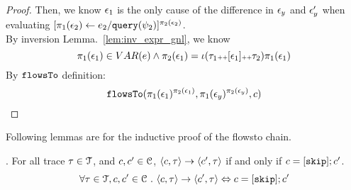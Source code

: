 \begin{proof}
Then, we know $\mathtt{\epsilon}_1$ is the only cause of the difference in $\mathtt{\epsilon}_y$ and $\mathtt{\epsilon}_y'$ when evaluating 
$[\mathrel{ \pi_1(\mathtt{\epsilon}_2) \leftarrow e_2 / {\tt query}(\psi_2) }]{}^{\pi_2(\mathtt{\epsilon}_2)}$.
%
\\
By inversion Lemma.~\ref{lem:inv_expr_gnl}, we know
\[
  \pi_1(\mathtt{\epsilon}_1) \in VAR(e) \land {\pi_2(\ensuremath{\mathtt{\epsilon}}_1)} = \iota(\mathtt{\tau}_1 {\scriptscriptstyle ++} [\mathtt{\epsilon}_1] {\scriptscriptstyle ++} \mathtt{\tau}_2) \pi_1(\mathtt{\epsilon}_1) 
\]
%
By $\mathtt{flowsTo}$ definition:
\[
  \mathtt{flowsTo}(\pi_1(\mathtt{\epsilon}_1)^{\pi_2(\mathtt{\epsilon}_1)}, \pi_1(\mathtt{\epsilon}_y)^{\pi_2(\mathtt{\epsilon}_y)}, c)
\]
\end{proof}
%
Following lemmas are for the inductive proof of the flowsto chain.
\begin{lem}.
	\label{lem:inv_skip}
	For all trace $\mathtt{\tau}\in \mathcal{T}$, and $c, c' \in \mathcal{C}$,  
	$\langle c, \mathtt{\tau} \rangle \rightarrow \langle c', \mathtt{\tau} \rangle$ if and only if $c = [\mathtt{skip}];c'$. 
	\[
		\forall \mathtt{\tau}\in \mathcal{T}, c, c' \in \mathcal{C} ~.~
		\langle c, \mathtt{\tau} \rangle \rightarrow \langle c', \mathtt{\tau} \rangle
		\Leftrightarrow 
		c = [\mathtt{skip}];c'
	\]
	\end{lem}	
%
